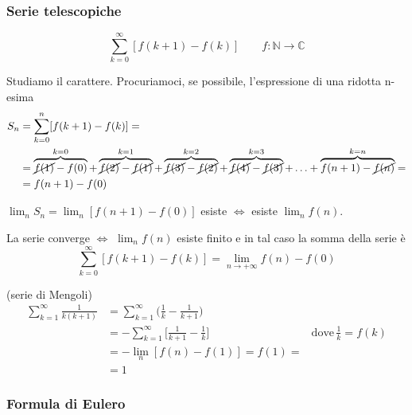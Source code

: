 \subsubsection{Serie telescopiche}
\begin{equation*}
	\sum_{k=0}^\infty [f(k+1) - f(k)] \qquad f:\mathbb{N}\rightarrow\mathbb{C}
\end{equation*}


Studiamo il carattere. Procuriamoci, se possibile, l'espressione di una ridotta n-esima
\begin{align*}
	S_n &= \sum_{k=0}^n [f(k+1)-f(k)] = \\
	&= \overbrace{\cancel{f(1)}-f(0)}^{k=0} + \overbrace{\cancel{f(2)}-\cancel{f(1)}}^{k=1} + \overbrace{\cancel{f(3)}-\cancel{f(2)}}^{k=2} +  \overbrace{\cancel{f(4)}-\cancel{f(3)}}^{k=3} + \ldots + \overbrace{f(n+1)-\cancel{f(n)}}^{k=n} = \\
	&= f(n+1) -f(0)
\end{align*}
\begin{attbar}
	$\lim_{n}S_n = \lim_{n}[f(n+1)-f(0)]$ esiste $\iff$ esiste $\lim_{n} f(n)$.
	
	La serie converge $\iff$ $\lim_{n} f(n)$ esiste finito e in tal caso la somma della serie è 
	\begin{equation*}
			\sum_{k=0}^\infty [f(k+1)-f(k)] = \lim_{n\rightarrow+\infty} f(n)-f(0)
	\end{equation*}

\end{attbar}

\begin{exbar}
	\begin{example} (serie di Mengoli)
		\begin{align*}
			\sum_{k=1}^\infty \frac{1}{k(k+1)} 
			&= \sum_{k=1}^\infty \biggl( \frac{1}{k} -\frac{1}{k+1} \biggr) \\
			&= -\sum_{k=1}^\infty \biggl[\frac{1}{k+1} - \frac{1}{k}\biggr] & \mathrm{dove} \, \frac{1}{k}=f(k) \\
			&= -\lim_{n}[f(n)-f(1)] = f(1) = \\
			&= 1
		\end{align*}
	\end{example}
\end{exbar}

\subsubsection{Formula di Eulero} 

